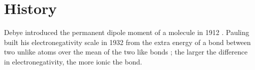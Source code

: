 \section{History}
Debye introduced the permanent dipole moment of a molecule in 1912 \cite{debye1912}. Pauling built his electronegativity scale in 1932 from the extra energy of a bond between two unlike atoms over the mean of the two like bonds \cite{pauling1932}; the larger the difference in electronegativity, the more ionic the bond.
